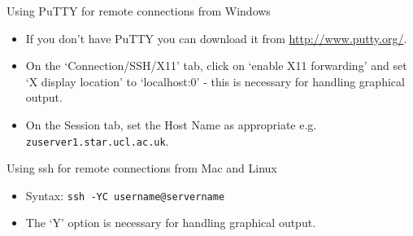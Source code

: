 \documentclass{beamer}
\newcommand{\command}[1]{\colorbox{light-gray}{\texttt{#1}}}
\begin{document}



\begin{frame}{Using PuTTY for remote connections from Windows}
  \begin{itemize}
    \item If you don't have PuTTY you can download it from \url{http://www.putty.org/}.
    \item On the `Connection/SSH/X11' tab, click on `enable X11 forwarding' and set `X display location' to `localhost:0' - this is necessary for handling graphical output.
    \item On the Session tab, set the Host Name as appropriate e.g. \texttt{zuserver1.star.ucl.ac.uk}.
  \end{itemize}
\end{frame}

\begin{frame}{Using ssh for remote connections from Mac and Linux}
  \begin{itemize}
    \item Syntax: \command{ssh -YC username@servername}
    \item The `Y' option is necessary for handling graphical output.
  \end{itemize}
\end{frame}
\end{document}
